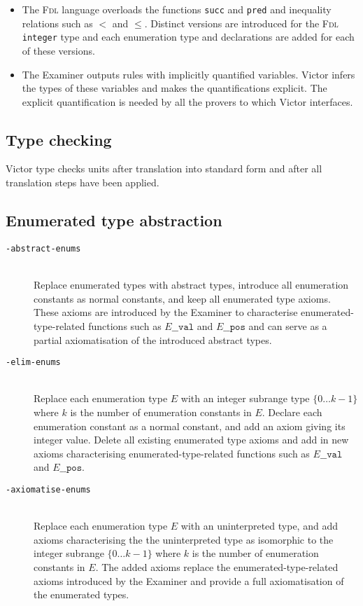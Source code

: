 \documentclass[12pt,fleqn]{article}
\newcommand{\fdl}{\textsc{Fdl}}
\newcommand{\optionb}[1]{\item[\texttt{-{#1}}]\ \\}
\begin{document}
\begin{itemize}
\item The \fdl{} language overloads the functions \texttt{succ} and
  \texttt{pred} and inequality relations such as $<$ and $\leq$.
  Distinct versions are introduced for the \fdl{} \texttt{integer} type
  and each enumeration type and declarations are added for each of
  these versions.

\item The Examiner outputs rules with implicitly quantified variables.
  Victor infers the types of these variables and makes the
  quantifications explicit.  The explicit quantification is needed by
  all the provers to which Victor interfaces.

\end{itemize}


\subsection{Type checking}

Victor type checks units after translation into standard form
and after all translation steps have been applied.


\subsection{Enumerated type abstraction}

\begin{description}
\optionb{abstract-enums} 
  Replace enumerated types with abstract types, introduce all
  enumeration constants as normal constants, and keep all enumerated
  type axioms.  
  These axioms are introduced by the Examiner to
  characterise enumerated-type-related functions such as
  $\mathit{E}\mathtt{\_\_val}$ and $\mathit{E}\mathtt{\_\_pos}$ and
  can serve as a partial axiomatisation of the introduced
  abstract types.

\optionb{elim-enums}      
  Replace each enumeration type $E$ with an integer subrange type $\{0
  \ldots k - 1 \}$ where $k$ is the number of enumeration constants in
  $E$.
  Declare each enumeration constant as a normal constant, and add an axiom
  giving its integer value.
  Delete all existing enumerated type axioms and add in new axioms
  characterising enumerated-type-related functions such as 
  $\mathit{E}\mathtt{\_\_val}$ and  $\mathit{E}\mathtt{\_\_pos}$.

\optionb{axiomatise-enums}
  Replace each enumeration type $E$ with an uninterpreted type, and add
  axioms characterising the the uninterpreted type as isomorphic to the
  integer subrange $\{0 \ldots k - 1 \}$ where $k$ is the number of
  enumeration constants in $E$.
  The added axioms replace the enumerated-type-related axioms
  introduced by the Examiner and provide a full axiomatisation of
  the enumerated types.

\end{description}
\end{document}
